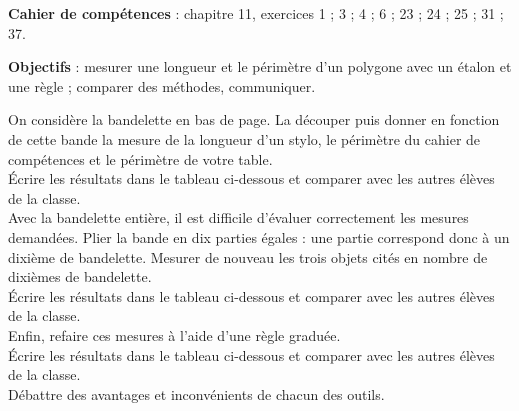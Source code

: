 \vfill

\textcolor{PartieGeometrie}{\large\sffamily\bfseries Cahier de compétences} : chapitre 11, exercices 1 ; 3 ; 4 ; 6 ; 23 ; 24 ; 25 ; 31 ; 37.

\activites

\begin{activite}
   {\bf Objectifs} : mesurer une longueur et le périmètre d'un polygone avec un étalon et une règle ; comparer des méthodes, communiquer.
   \begin{QCM}
         On considère la bandelette en bas de page. La découper puis donner en fonction de cette bande la mesure de la longueur d'un stylo, le périmètre du cahier de compétences et le périmètre de votre table. \\
         Écrire les résultats dans le tableau ci-dessous et comparer avec les autres élèves de la classe. \\
         
         Avec la bandelette entière, il est difficile d'évaluer correctement les mesures demandées. Plier la bande en dix parties égales : une partie correspond donc à un dixième de bandelette. Mesurer de nouveau les trois objets cités en nombre de dixièmes de bandelette. \\
         Écrire les résultats dans le tableau ci-dessous et comparer avec les autres élèves de la classe. \\
      
         Enfin, refaire ces mesures à l'aide d'une règle graduée. \\
         Écrire les résultats dans le tableau ci-dessous et comparer avec les autres élèves de la classe. \\
         Débattre des avantages et inconvénients de chacun des outils. \\
      

\end{QCM}
\end{activite}
